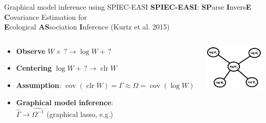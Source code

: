 \documentclass[professionalfonts]{beamer}
\newcommand{\clr}{\operatorname{clr}}
\newcommand{\cov}{\operatorname{cov}}
\begin{document}
\begin{frame}{Graphical model inference using SPIEC-EASI}
\textbf{SPIEC-EASI}: \textbf{SP}arse \textbf{I}nvers\textbf{E} \textbf{C}ovariance Estimation for \\ \textbf{E}cological \textbf{AS}sociation \textbf{I}nference (Kurtz et al. 2015)
\begin{columns}
\begin{column}{0.6\textwidth}
\begin{itemize}
\item \textbf{Observe} $W \times\,? \rightarrow \log W +\,?$
\item \textbf{Centering} $\log W +\,? \rightarrow \clr W$
\item \textbf{Assumption}: $\cov(\clr W) = \Gamma \approx \Omega = \cov(\log W)$
\item \textbf{Graphical model inference}: \\ $\widehat{\Gamma} \rightarrow \widehat{\Omega^{-1}}$ (graphical lasso, e.g.)
\end{itemize}
\end{column}
\begin{column}{0.4\textwidth}
\begin{center}
\includegraphics[width=110px]{figs/graph-model-log.pdf}
\end{center}
\end{column}
\end{columns}
\end{frame}
\end{document}
